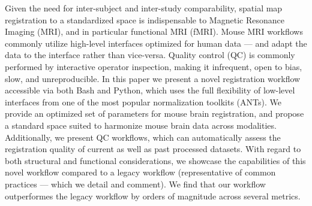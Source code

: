 Given the need for inter-subject and inter-study comparability, spatial map registration to a standardized space is indispensable to Magnetic Resonance Imaging (MRI), and in particular functional MRI (fMRI).
Mouse MRI workflows commonly utilize high-level interfaces optimized for human data --- and adapt the data to the interface rather than vice-versa.
Quality control (QC) is commonly performed by interactive operator inspection, making it infrequent, open to bias, slow, and unreproducible.
In this paper we present a novel registration workflow accessible via both Bash and Python, which uses the full flexibility of low-level interfaces from one of the most popular normalization toolkits (ANTs).
We provide an optimized set of parameters for mouse brain registration, and propose a standard space suited to harmonize mouse brain data across modalities.
Additionally, we present QC workflows, which can automatically assess the registration quality of current as well as past processed datasets.
With regard to both structural and functional considerations, we showcase the capabilities of this novel workflow compared to a legacy workflow (representative of common practices --- which we detail and comment).
We find that our workflow outperformes the legacy workflow by orders of magnitude across several metrics.
